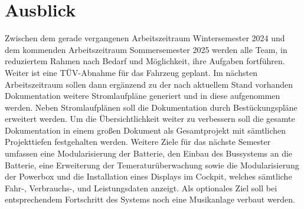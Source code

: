 \section{Ausblick}
Zwischen dem gerade vergangenen Arbeitszeitraum \glqq Wintersemester 2024 \grqq und dem kommenden Arbeitszeitraum \glqq Sommersemester 2025 \grqq werden alle Team, in reduziertem Rahmen nach Bedarf und Möglichkeit,  ihre Aufgaben fortführen. Weiter ist eine TÜV-Abnahme für das Fahrzeug geplant.\newline
Im nächsten Arbeitszeitraum sollen dann ergänzend zu der nach aktuellem Stand vorhanden Dokumentation weitere Stromlaufpläne generiert und in diese aufgenommen werden. Neben Stromlaufplänen soll die Dokumentation durch Bestückungspläne erweitert werden. Um die Übersichtlichkeit weiter zu verbessern soll die gesamte Dokumentation in einem großen Dokument als Gesamtprojekt mit sämtlichen Projekttiefen festgehalten werden. Weitere Ziele für das nächste Semester umfassen eine Modularisierung der Batterie, den Einbau des Bussystems an die Batterie, eine Erweiterung der Temeraturüberwachung sowie die Modularisierung der Powerbox und die Installation eines Displays im Cockpit, welches sämtliche Fahr-, Verbrauchs-, und Leistungsdaten anzeigt. Als optionales Ziel soll bei entsprechendem Fortschritt des Systems noch eine Musikanlage verbaut werden.
